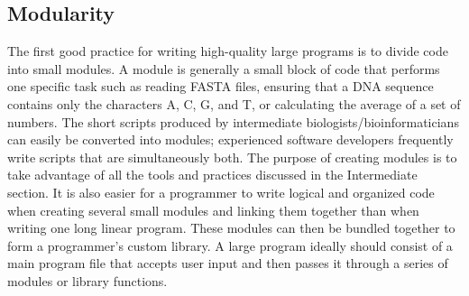 \documentclass[ChapterTOCs,krantz2]{krantz} %
\begin{document}
\subsection{Modularity}

The first good practice for writing high-quality large programs is to divide
code into small modules.  A module is generally a small block of code that
performs one specific task such as reading FASTA files, ensuring that a DNA
sequence contains only the characters A, C, G, and T, or calculating the
average of a set of numbers.  The short scripts produced by intermediate
biologists/bioinformaticians can easily be converted into modules; experienced
software developers frequently write scripts that are simultaneously both.  
The purpose of creating modules is to take
advantage of all the tools and practices discussed in the Intermediate section.  
It is also easier for a programmer to write logical and organized
code when creating several small modules and linking them together than when
writing one long linear program.  These modules can then be bundled together to
form a programmer's custom library.  A large program ideally should consist of
a main program file that accepts user input and then passes it through a series
of modules or library functions.  
\end{document}
